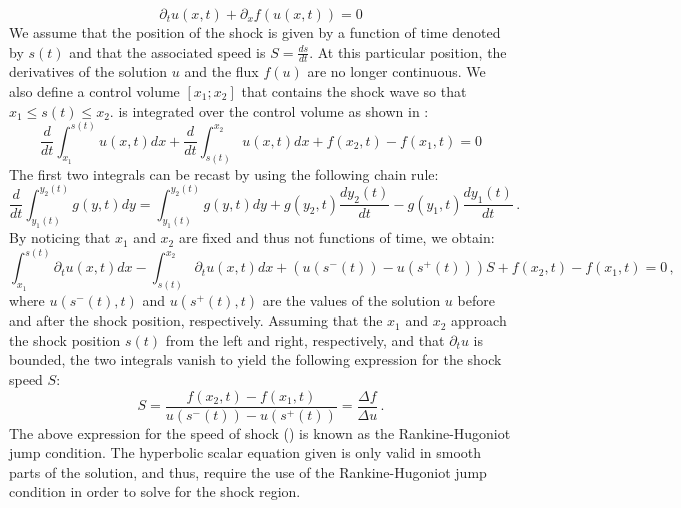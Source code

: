%
\begin{equation}\label{eq:rh_sct1b}
\partial_t u(x,t) + \partial_x f(u(x,t)) = 0
\end{equation}
%
We assume that the position of the shock is given by a function of time denoted by $s(t)$ and that the associated speed is $S = \frac{ds}{dt}$. At this particular position, the derivatives of the solution $u$ and the flux $f(u)$ are no longer continuous. We also define a control volume $\left[ x_1; x_2 \right]$ that contains the shock wave so that $x_1 \leq s(t) \leq x_2$.  is integrated over the control volume as shown in :
%
\begin{equation}\label{eq:rh2_sct1b}
\frac{d}{dt} \int_{x_1}^{s(t)} u(x,t) dx + \frac{d}{dt} \int_{s(t)}^{x_2} u(x,t) dx + f(x_2,t) - f(x_1,t) = 0
\end{equation}
% 
The first two integrals can be recast by using the following chain rule:
%
\begin{equation}\label{eq:rh3_sct1b}
\frac{d}{dt} \int_{y_1(t)}^{y_2(t)} g(y,t) dy =  \int_{y_1(t)}^{y_2(t)} g(y,t) dy + g(y_2,t) \frac{d y_2(t)}{dt} - g(y_1,t) \frac{d y_1(t)}{dt} \,.
\end{equation}
% 
By noticing that $x_1$ and $x_2$ are fixed and thus not functions of time, we obtain:
%
\begin{equation}\label{eq:rh4_sct1b}
\int_{x_1}^{s(t)} \partial_t u(x,t) dx - \int_{s(t)}^{x_2} \partial_t u(x,t) dx + \left( u(s^-(t)) - u(s^+(t)) \right) S + f(x_2,t) - f(x_1,t) = 0 \,,
\end{equation}
%
where $u(s^-(t),t)$ and $u(s^+(t),t)$ are the values of the solution $u$ before and after the shock position, respectively. Assuming that the $x_1$ and $x_2$ approach the shock position $s(t)$ from the left and right, respectively, and that $\partial_t u$ is bounded, the two integrals vanish to yield the following expression for the shock speed  $S$:
%
\begin{equation}\label{eq:rh5_sct1b}
S = \frac{f(x_2,t) - f(x_1,t)}{u(s^-(t)) - u(s^+(t))} = \frac{\Delta f}{\Delta u} \,.
\end{equation}
%
The above expression for the speed of shock () is known as the Rankine-Hugoniot jump condition. The hyperbolic scalar equation given  is only valid in smooth parts of the solution, and thus, require the use of the Rankine-Hugoniot jump condition in order to solve for the shock region.   


